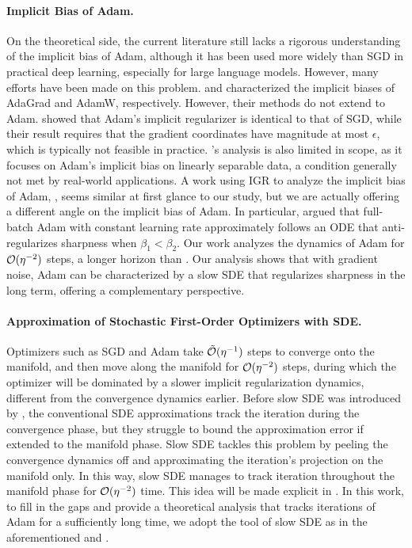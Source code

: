\paragraph{Implicit Bias of Adam.}
On the theoretical side, the current literature still lacks a rigorous understanding of the implicit bias of Adam, although it has been used more widely than SGD in practical deep learning, especially for large language models. However, many efforts have been made on this 
problem. \citet{qian2019implicit} and \citet{xie2024implicit} characterized the implicit biases of AdaGrad and AdamW, respectively. However, their methods do not extend to Adam. \citet{wang2021implicit} showed that Adam's implicit regularizer is identical to that of SGD, while their result requires that the gradient coordinates have magnitude at most $\epsilon$, which is typically not feasible in practice. \citet{zhang2024implicitbiasadamseparable}'s analysis is also limited in scope, as it focuses on Adam's implicit bias on linearly separable data, a condition generally not met by real-world applications. A work using IGR to analyze the implicit bias of Adam, \citet{cattaneo2024implicitbiasadam}, seems similar at first glance to our study, but we are actually offering a different angle on the implicit bias of Adam. In particular, \citet{cattaneo2024implicitbiasadam} argued that full-batch Adam with constant learning rate approximately follows an ODE that anti‐regularizes sharpness when $\beta_1<\beta_2$. Our work analyzes the dynamics of Adam for $\mathcal{O}(\eta^{-2})$ steps, a longer horizon than \citet{cattaneo2024implicitbiasadam}. Our analysis shows that with gradient noise, Adam can be characterized by a slow SDE that regularizes sharpness in the long term, offering a complementary perspective.


\paragraph{Approximation of Stochastic First-Order Optimizers with SDE.} 
Optimizers such as SGD and Adam take $\tilde{\mathcal{O}}(\eta^{-1})$ steps to converge onto the manifold, and then move along the manifold for $\mathcal{O}(\eta^{-2})$ steps, during which the optimizer will be dominated by a slower implicit regularization dynamics, different from the convergence dynamics earlier. Before slow SDE was introduced by \citet{li2021happens}, the conventional SDE approximations \citep{li2018stochasticmodifiedequationsdynamics,li2021validitymodelingsgdstochastic,cattaneo2024implicitbiasadam,malladi2024sdesscalingrulesadaptive} track the iteration during the convergence phase, but they struggle to bound the approximation error if extended to the manifold phase. Slow SDE tackles this problem by peeling the convergence dynamics off and approximating the iteration's projection on the manifold only. In this way, slow SDE manages to track iteration throughout the manifold phase for $\mathcal{O}(\eta^{-2})$ time. This idea will be made explicit in . 
In this work, to fill in the gaps and provide a theoretical analysis that tracks iterations of Adam for a sufficiently long time, we adopt the tool of slow SDE as in the aforementioned \citet{li2021happens} and \citet{gu2023and}.

